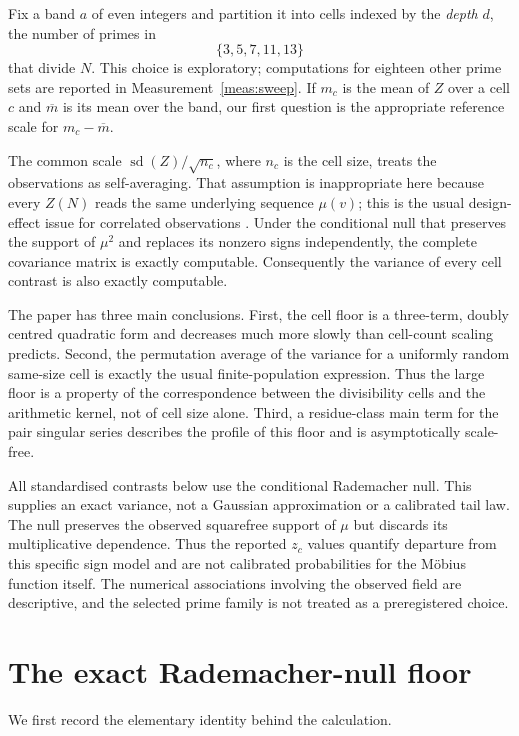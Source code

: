 \documentclass[11pt,a4paper]{article}
\theoremstyle{plain}
\theoremstyle{definition}
\theoremstyle{remark}
\begin{document}
Fix a band $a$ of even integers and partition it into cells indexed by
the \emph{depth} $d$, the number of primes in
\[
 \{3,5,7,11,13\}
\]
that divide $N$.  This choice is exploratory; computations for eighteen
other prime sets are reported in Measurement~\ref{meas:sweep}.  If
$m_c$ is the mean of $Z$ over a cell $c$ and $\overline m$ is its mean
over the band, our first question is the appropriate reference scale
for $m_c-\overline m$.

The common scale $\operatorname{sd}(Z)/\sqrt{n_c}$, where $n_c$ is the
cell size, treats the observations as self-averaging.  That assumption
is inappropriate here because every $Z(N)$ reads the same underlying
sequence $\mu(v)$; this is the usual design-effect issue for correlated
observations \cite{Kish}.  Under the conditional null that preserves the
support of $\mu^2$ and replaces its nonzero signs independently, the
complete covariance matrix is exactly computable.  Consequently the
variance of every cell contrast is also exactly computable.

The paper has three main conclusions.  First, the cell floor is a
three-term, doubly centred quadratic form and decreases much more slowly
than cell-count scaling predicts.  Second, the permutation average of
the variance for a uniformly random same-size cell is exactly the usual
finite-population expression.  Thus the large floor is a property of
the correspondence between the divisibility cells and the arithmetic
kernel, not of cell size alone.  Third, a residue-class main term for
the pair singular series describes the profile of this floor and is
asymptotically scale-free.

All standardised contrasts below use the conditional Rademacher null.
This supplies an exact variance, not a Gaussian approximation or a
calibrated tail law.  The null preserves the observed squarefree support
of $\mu$ but discards its multiplicative dependence.  Thus the reported
$z_c$ values quantify departure from this specific sign model and are
not calibrated probabilities for the M\"obius function itself.  The
numerical associations involving the observed field are descriptive,
and the selected prime family is not treated as a preregistered choice.

\section{The exact Rademacher-null floor}\label{sec:floor}

We first record the elementary identity behind the calculation.
\end{document}

